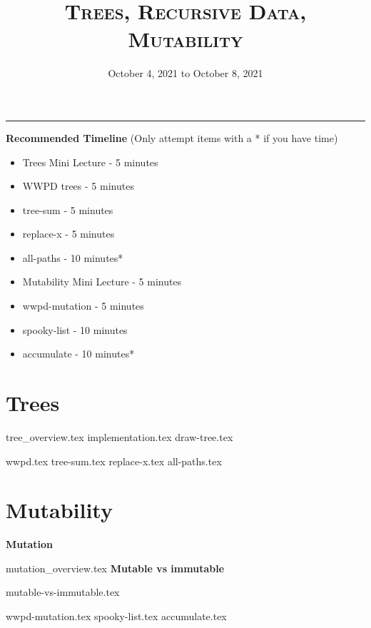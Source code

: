 \documentclass{exam}
\title{\textsc{Trees, Recursive Data, Mutability}}
\date{October 4, 2021 to October 8, 2021}
\begin{document}
	\maketitle
	\rule{\textwidth}{0.15em}
	\fontsize{12}{15}\selectfont

\begin{guide}
	\textbf{Recommended Timeline}
	(Only attempt items with a * if you have time)
	\begin{itemize}
		\item Trees Mini Lecture - 5 minutes
		\item WWPD trees - 5 minutes
		\item tree-sum - 5 minutes
		\item replace-x - 5 minutes
		\item all-paths - 10 minutes*
		\item Mutability Mini Lecture - 5 minutes
		\item wwpd-mutation - 5 minutes
		\item spooky-list - 10 minutes
		\item accumulate - 10 minutes*
	\end{itemize}
\end{guide}

\section{Trees}
	{tree_overview.tex}
	{implementation.tex}
	{draw-tree.tex}
	\begin{questions}
		{wwpd.tex}
		\newpage
		{tree-sum.tex}
		\newpage
		{replace-x.tex}
		\newpage
		{all-paths.tex}
	\end{questions}	
\newpage
\section{Mutability}
	\textbf{Mutation}

	{mutation_overview.tex}
	\textbf{Mutable vs immutable}

	{mutable-vs-immutable.tex}
	\begin{questions}
		{wwpd-mutation.tex}
		\newpage
		{spooky-list.tex}
		\newpage
		{accumulate.tex}
	\end{questions}
\end{document}
